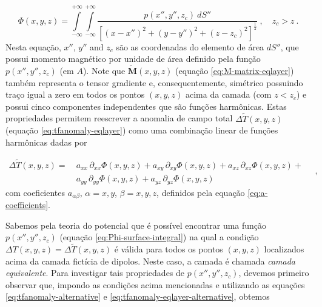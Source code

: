 \begin{equation}
	\Phi(x, y, z) = \int\limits_{-\infty}^{+\infty}\int\limits_{-\infty}^{+\infty}
	\frac{p(x'', y'', z_{c}) \: dS''}
	{\left[ (x-x'')^2 + (y-y'')^2 + (z-z_{c})^2 \right]^{\frac{1}{2}}} \: ,
	\quad z_{c} > z \: .
	\label{eq:Phi-surface-integral}
\end{equation}
Nesta equação, $x''$, $y''$ and $z_{c}$ são as coordenadas do elemento de área $dS''$, que possui momento magnético por unidade de área definido pela função $p(x'', y'', z_{c})$ (em $A$). Note que $\tilde{\mathbf{M}}(x, y, z)$ (equação \ref{eq:M-matrix-eqlayer}) também representa o tensor gradiente \citep{pedersen_rasmussen1990} e, consequentemente, simétrico possuindo traço igual a zero em todos os pontos $(x,y,z)$ acima da camada (com $z < z_{c}$) e possui cinco componentes independentes que são funções harmônicas. Estas propriedades permitem reescrever a anomalia de campo total  $\Delta \tilde{T}(x, y, z)$ (equação \ref{eq:tfanomaly-eqlayer}) como uma combinação linear de funções harmônicas dadas por

\begin{equation}
       \begin{split}
		\Delta \tilde{T}(x, y, z) = \:
		& a_{xx} \, \partial_{xx} \Phi(x, y, z) + 
		a_{xy} \, \partial_{xy} \Phi(x, y, z) + 
		a_{xz} \, \partial_{xz} \Phi(x, y, z) + \\
		& a_{yy} \, \partial_{yy} \Phi(x, y, z) + 
		a_{yz} \, \partial_{yz} \Phi(x, y, z)
		\end{split} \quad ,
	\label{eq:tfanomaly-eqlayer-alternative}
\end{equation}
com coeficientes $a_{\alpha\beta}$, $\alpha = x, y$, $\beta = x, y, z$, definidos pela equação \ref{eq:a-coefficients}.

Sabemos pela teoria do potencial que é possível encontrar uma função $p(x'', y'', z_{c})$ (equação \ref{eq:Phi-surface-integral}) na qual a condição $\Delta T(x, y, z) = \Delta \tilde{T}(x, y, z)$ é válida para todos os pontos $(x,y,z)$ localizados acima da camada fictícia de dipolos. Neste caso, a camada é chamada \textit{camada equivalente}. Para investigar tais propriedades de $p(x'', y'', z_{c})$, devemos primeiro observar que, impondo as condições acima mencionadas e utilizando as equações \ref{eq:tfanomaly-alternative} e \ref{eq:tfanomaly-eqlayer-alternative}, obtemos 

